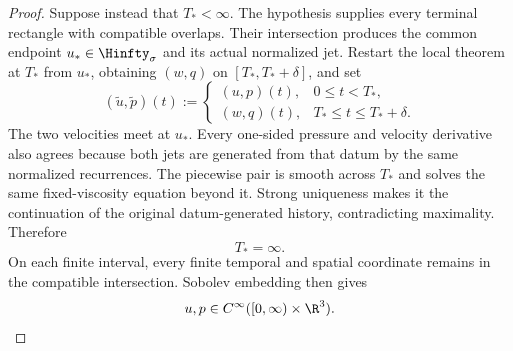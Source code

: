 \begin{proof}
Suppose instead that \(T_*<\infty\).  The hypothesis supplies every terminal
rectangle with compatible overlaps.  Their intersection produces the common
endpoint \(u_*\in\Hinfty_\sigma\) and its actual normalized jet.  Restart the
local theorem at \(T_*\) from \(u_*\), obtaining \((w,q)\) on
\([T_*,T_*+\delta]\), and set
\[
  (\widetilde u,\widetilde p)(t)
  :=
  \begin{cases}
    (u,p)(t),&0\leq t<T_*,\\
    (w,q)(t),&T_*\leq t\leq T_*+\delta.
  \end{cases}
\]
The two velocities meet at \(u_*\).  Every one-sided pressure and velocity
derivative also agrees because both jets are generated from that datum by the
same normalized recurrences.  The piecewise pair is smooth across \(T_*\) and
solves the same fixed-viscosity equation beyond it.  Strong uniqueness makes it
the continuation of the original datum-generated history, contradicting
maximality.  Therefore
\[
  T_*=\infty.
\]
On each finite interval, every finite temporal and spatial coordinate remains in
the compatible intersection.  Sobolev embedding then gives
\[
  u,p\in C^\infty([0,\infty)\times\R^3).
\]
\end{proof}
